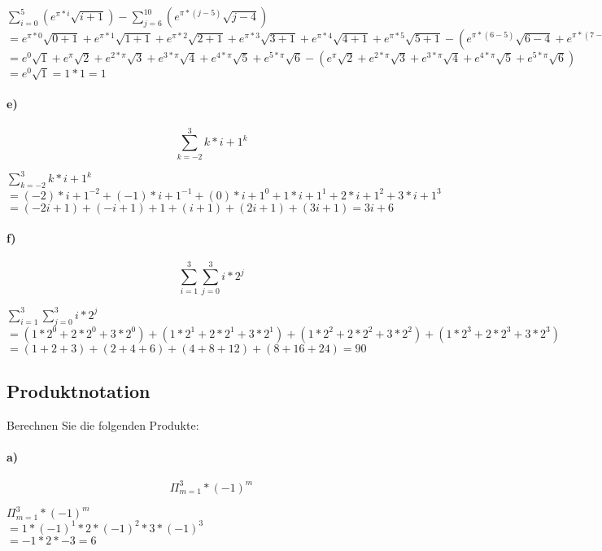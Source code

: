 \documentclass[paper=a4, fontsize=11pt]{scrartcl}
\numberwithin{equation}{section}
\numberwithin{figure}{section}
\numberwithin{table}{section}
\begin{document}
$\sum^{5}_{i=0}(e^{\pi *i} \sqrt{i+1})-\sum^{10}_{j=6}(e^{\pi *(j-5)} \sqrt{j-4})$ \\
$=
e^{\pi *0} \sqrt{0+1} + e^{\pi *1} \sqrt{1+1}
+ e^{\pi *2} \sqrt{2+1} + e^{\pi *3} \sqrt{3+1}
+ e^{\pi *4} \sqrt{4+1} + e^{\pi *5} \sqrt{5+1} 
- (e^{\pi *(6-5)} \sqrt{6-4} + e^{\pi *(7-5)} \sqrt{7-4} + e^{\pi *(8-5)} \sqrt{8-4} 
+ e^{\pi *(9-5)} \sqrt{9-4} + e^{\pi *(10-5)} \sqrt{10-4})$ \\
$=
e^{0} \sqrt{1} + e^{\pi} \sqrt{2} +  e^{2* \pi} \sqrt{3} +  e^{3* \pi} \sqrt{4} +  e^{4* \pi} \sqrt{5}
+  e^{5* \pi} \sqrt{6}
-( e^{\pi} \sqrt{2} +  e^{2* \pi} \sqrt{3}
+  e^{3* \pi} \sqrt{4} +  e^{4* \pi} \sqrt{5}
+  e^{5* \pi} \sqrt{6})  $ \\
$=
e^{0} \sqrt{1} = 1*1 = 1 $

\paragraph{e)}
$$\sum^{3}_{k=-2}k*i+1^{k}$$

$\sum^{3}_{k=-2}k*i+1^{k}$ \\
$=
(-2)*i+1^{-2} + (-1)*i+1^{-1} + (0)*i+1^{0}
+ 1*i+1^{1} + 2*i+1^{2} + 3*i+1^{3}$ \\
$=
(-2i+1)+(-i+1)+1+(i+1)+(2i+1)+(3i+1) = 3i+6
$
\paragraph{f)}
$$\sum^{3}_{i=1} \sum^{3}_{j=0}i*2^{j}$$

$\sum^{3}_{i=1} \sum^{3}_{j=0}i*2^{j}$ \\
$=
(1*2^{0}+2*2^{0}+3*2^{0})
+(1*2^{1}+2*2^{1}+3*2^{1})
+(1*2^{2}+2*2^{2}+3*2^{2})
+(1*2^{3}+2*2^{3}+3*2^{3})$ \\
$=
(1+2+3)+(2+4+6)+(4+8+12)+(8+16+24) = 90$
\subsection{Produktnotation}
Berechnen Sie die folgenden Produkte:
\paragraph{a)}
$$\Pi^{3}_{m=1}*(-1)^{m}$$

$\Pi^{3}_{m=1}*(-1)^{m}$ \\
$=1*(-1)^{1} *2*(-1)^{2} * 3*(-1)^{3}$ \\
$= -1* 2 *-3 = 6$
\end{document}
